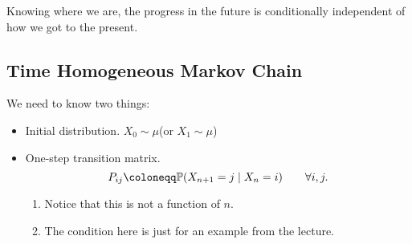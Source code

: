 \begin{intuition}
	Knowing where we are, the progress in the future is conditionally independent of how we got to the present.
\end{intuition}

\subsection{Time Homogeneous Markov Chain}
We need to know two things:
\begin{itemize}
	\item Initial distribution. \(X_0 \sim \mu\)(or \(X_1\sim \mu\))
	\item One-step transition matrix.
	      \[
		      P_{ij} \coloneqq \mathbb{\MakeUppercase{P}}(X_{n+1} = j \mid X_n = i)\qquad \forall i, j.
	      \]


	      \begin{note}
		      \begin{enumerate}
			      \item Notice that this is not a function of \(n\).
			      \item The condition here is just for an example from the lecture.
		      \end{enumerate}
	      \end{note}


\end{itemize}
